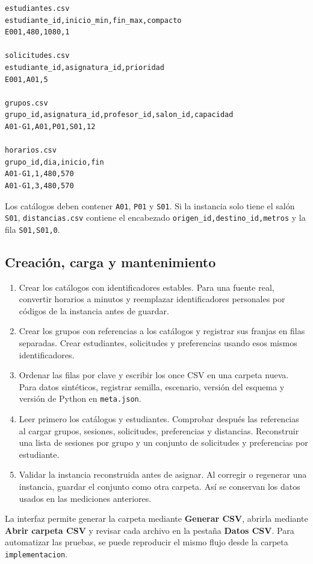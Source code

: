 \documentclass[11pt]{article}
\numberwithin{equation}{section}
\numberwithin{figure}{section}
\numberwithin{table}{section}
\theoremstyle{definition}
\begin{document}
\begin{verbatim}
estudiantes.csv
estudiante_id,inicio_min,fin_max,compacto
E001,480,1080,1

solicitudes.csv
estudiante_id,asignatura_id,prioridad
E001,A01,5

grupos.csv
grupo_id,asignatura_id,profesor_id,salon_id,capacidad
A01-G1,A01,P01,S01,12

horarios.csv
grupo_id,dia,inicio,fin
A01-G1,1,480,570
A01-G1,3,480,570
\end{verbatim}

Los catálogos deben contener \texttt{A01}, \texttt{P01} y \texttt{S01}.
Si la instancia solo tiene el salón \texttt{S01}, \texttt{distancias.csv}
contiene el encabezado \texttt{origen\_id,destino\_id,metros} y la fila
\texttt{S01,S01,0}.

\subsection{Creación, carga y mantenimiento}

\begin{enumerate}
  \item Crear los catálogos con identificadores estables. Para una fuente
        real, convertir horarios a minutos y reemplazar identificadores
        personales por códigos de la instancia antes de guardar.
  \item Crear los grupos con referencias a los catálogos y registrar sus
        franjas en filas separadas. Crear estudiantes, solicitudes y
        preferencias usando esos mismos identificadores.
  \item Ordenar las filas por clave y escribir los once CSV en una carpeta
        nueva. Para datos sintéticos, registrar semilla, escenario, versión
        del esquema y versión de Python en \texttt{meta.json}.
  \item Leer primero los catálogos y estudiantes. Comprobar después las
        referencias al cargar grupos, sesiones, solicitudes, preferencias
        y distancias. Reconstruir una lista de sesiones por grupo y un
        conjunto de solicitudes y preferencias por estudiante.
  \item Validar la instancia reconstruida antes de asignar. Al corregir o
        regenerar una instancia, guardar el conjunto como otra carpeta.
        Así se conservan los datos usados en las mediciones anteriores.
\end{enumerate}

La interfaz permite generar la carpeta mediante \textbf{Generar CSV},
abrirla mediante \textbf{Abrir carpeta CSV} y revisar cada archivo en la
pestaña \textbf{Datos CSV}. Para automatizar las pruebas, se puede reproducir
el mismo flujo desde la carpeta \texttt{implementacion}.
\end{document}

